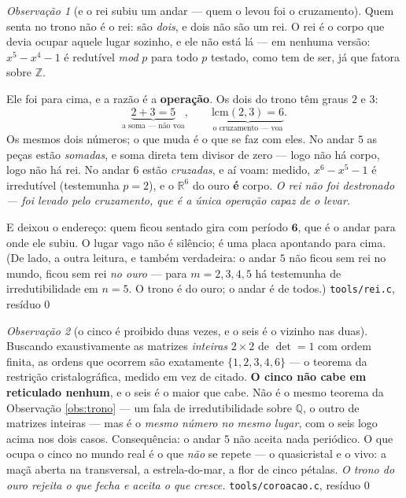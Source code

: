 \documentclass[11pt]{article}
\newcommand{\code}[1]{\texttt{\small #1}}
\newcommand{\Z}{\mathbb Z}
\newcommand{\R}{\mathbb R}
\newcommand{\Q}{\mathbb Q}
\theoremstyle{plain}
\theoremstyle{remark}
\newtheorem{obs}{Observação}
\begin{document}
\begin{obs}[e o rei subiu um andar --- quem o levou foi o cruzamento]\label{obs:rei}
Quem senta no trono não é o rei: são \emph{dois}, e dois não são um rei. O rei é o corpo que devia
ocupar aquele lugar sozinho, e ele não está lá --- em nenhuma versão: $x^5-x^4-1$ é redutível
\emph{mod} $p$ para todo $p$ testado, como tem de ser, já que fatora sobre $\Z$.

Ele foi para cima, e a razão é a \textbf{operação}. Os dois do trono têm graus $2$ e $3$:
\[
 \underbrace{2+3=5}_{\text{a soma --- não voa}},\qquad
 \underbrace{\mathrm{lcm}(2,3)=6}_{\text{o cruzamento --- voa}}.
\]
Os mesmos dois números; o que muda é o que se faz com eles. No andar $5$ as peças estão
\emph{somadas}, e soma direta tem divisor de zero --- logo não há corpo, logo não há rei. No andar
$6$ estão \emph{cruzadas}, e aí voam: medido, $x^6-x^5-1$ é irredutível (testemunha $p=2$), e o
$\R^6$ do ouro \textbf{é} corpo. \emph{O rei não foi destronado --- foi levado pelo cruzamento, que
é a única operação capaz de o levar.}

E deixou o endereço: quem ficou sentado gira com período $\mathbf{6}$, que é o andar para onde ele
subiu. O lugar vago não é silêncio; é uma placa apontando para cima. (De lado, a outra leitura, e
também verdadeira: o andar $5$ não ficou sem rei no mundo, ficou sem rei \emph{no ouro} --- para
$m=2,3,4,5$ há testemunha de irredutibilidade em $n=5$. O trono é do ouro; o andar é de todos.)
\hfill{\small\code{tools/rei.c}, resíduo $0$}
\end{obs}

\begin{obs}[o cinco é proibido duas vezes, e o seis é o vizinho nas duas]\label{obs:cinco}
Buscando exaustivamente as matrizes \emph{inteiras} $2\times2$ de $\det=1$ com ordem finita, as
ordens que ocorrem são exatamente $\{1,2,3,4,6\}$ --- o teorema da restrição cristalográfica, medido
em vez de citado. \textbf{O cinco não cabe em reticulado nenhum}, e o seis é o maior que cabe. Não é
o mesmo teorema da Observação \ref{obs:trono} --- um fala de irredutibilidade sobre $\Q$, o outro de
matrizes inteiras --- mas é o \emph{mesmo número no mesmo lugar}, com o seis logo acima nos dois
casos. Consequência: o andar $5$ não aceita nada periódico. O que ocupa o cinco no mundo real é o que
\emph{não} se repete --- o quasicristal e o vivo: a maçã aberta na transversal, a estrela-do-mar, a
flor de cinco pétalas. \emph{O trono do ouro rejeita o que fecha e aceita o que cresce.}
\hfill{\small\code{tools/coroacao.c}, resíduo $0$}
\end{obs}
\end{document}
